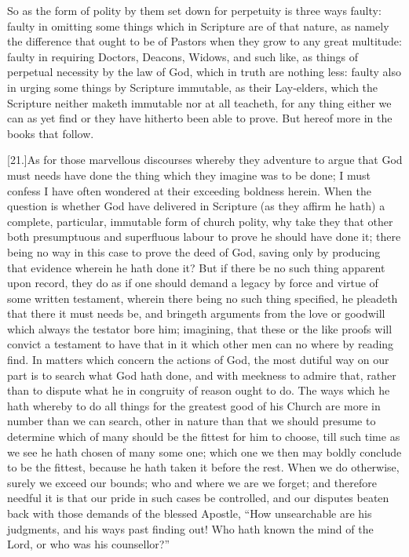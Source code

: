 So as the form of polity by them set down for perpetuity is three ways faulty: faulty in omitting some things which in Scripture are of that nature, as namely the difference that ought to be of Pastors when they grow to any great multitude: faulty in requiring Doctors, Deacons, Widows, and such like, as things of perpetual necessity by the law of God, which in truth are nothing less: faulty also in urging some things by Scripture immutable, as their Lay-elders, which the Scripture neither maketh immutable nor at all teacheth, for any thing either we can as yet find or they have hitherto been able to prove. But hereof more in the books that follow.

[21.]As for those marvellous discourses whereby they adventure to argue that God must needs have done the thing which they imagine was to be done; I must confess I have often wondered at their exceeding boldness herein. When the question is whether God have delivered in Scripture (as they affirm he hath) a complete, particular, immutable form of church polity, why take they that other both presumptuous and superfluous labour to prove he should have done it; there being no way in this case to prove the deed of God, saving only by producing that evidence wherein  he hath done it? But if there be no such thing apparent upon record, they do as if one should demand a legacy by force and virtue of some written testament, wherein there being no such thing specified, he pleadeth that there it must needs be, and bringeth arguments from the love or goodwill which always the testator bore him; imagining, that these or the like proofs will convict a testament to have that in it which other men can no where by reading find. In matters which concern the actions of God, the most dutiful way on our part is to search what God hath done, and with meekness to admire that, rather than to dispute what he in congruity of reason ought to do. The ways which he hath whereby to do all things for the greatest good of his Church are more in number than we can search, other in nature than that we should presume to determine which of many should be the fittest for him to choose, till such time as we see he hath chosen of many some one; which one we then may boldly conclude to be the fittest, because he hath taken it before the rest. When we do otherwise, surely we exceed our bounds; who and where we are we forget; and therefore needful it is that our pride in such cases be controlled, and our disputes beaten back with those demands of the blessed Apostle, “How unsearchable are his judgments, and his ways past finding out! Who hath known the mind of the Lord, or who was his counsellor?”
